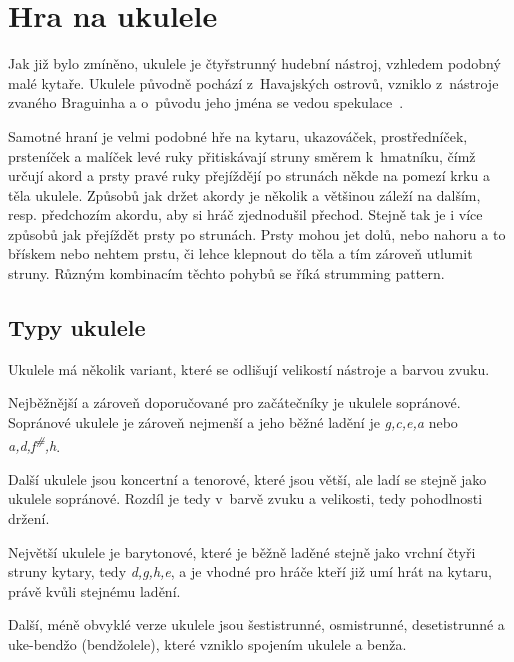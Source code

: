 \section{Hra na ukulele}
\label{sc:ukulele_playing}
Jak již bylo zmíněno, ukulele je čtyřstrunný hudební nástroj, vzhledem podobný malé kytaře. Ukulele původně pochází z~Havajských ostrovů, vzniklo z~nástroje zvaného Braguinha a o~původu jeho jména se vedou spekulace~\cite{rek_2008_kola}.

Samotné hraní je velmi podobné hře na kytaru, ukazováček, prostředníček, prsteníček a malíček levé ruky přitiskávají struny směrem k~hmatníku, čímž určují akord a prsty pravé ruky přejíždějí po strunách někde na pomezí krku a těla ukulele. Způsobů jak držet akordy je několik a většinou záleží na dalším, resp. předchozím akordu, aby si hráč zjednodušil přechod. Stejně tak je i více způsobů jak přejíždět prsty po strunách. Prsty mohou jet dolů, nebo nahoru a to břískem nebo nehtem prstu, či lehce klepnout do těla a tím zároveň utlumit struny. Různým kombinacím těchto pohybů se říká \gls{strumming pattern}.

\subsection{Typy ukulele}
\label{ss:ukulele_types}
Ukulele má několik variant, které se odlišují velikostí nástroje a barvou zvuku.

Nejběžnější a zároveň doporučované pro začátečníky je ukulele sopránové. Sopránové ukulele je zároveň nejmenší a jeho běžné ladění je \textit{g,c,e,a} nebo \textit{a,d,f\textsuperscript{\#},h}.

Další ukulele jsou koncertní a tenorové, které jsou větší, ale ladí se stejně jako ukulele sopránové. Rozdíl je tedy v~barvě zvuku a velikosti, tedy pohodlnosti držení.

Největší ukulele je barytonové, které je běžně laděné stejně jako vrchní čtyři struny kytary, tedy \textit{d,g,h,e}, a je vhodné pro hráče kteří již umí hrát na kytaru, právě kvůli stejnému ladění.

Další, méně obvyklé verze ukulele jsou šestistrunné, osmistrunné, desetistrunné a uke-bendžo (bendžolele), které vzniklo spojením ukulele a benža.
